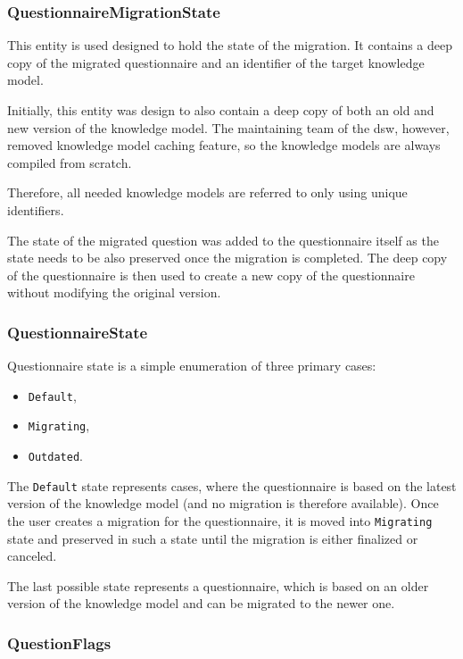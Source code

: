 \subsubsection*{QuestionnaireMigrationState}

This entity is used designed to hold the state of the migration.
It contains a deep copy of the migrated questionnaire and an identifier of the target knowledge model.

Initially, this entity was design to also contain a deep copy of both an old and new version of the knowledge model.
The maintaining team of the \gls{dsw}, however, removed knowledge model caching feature, so the knowledge models are always compiled from scratch\cite{gh-dsw-release-1.5}.

Therefore, all needed knowledge models are referred to only using unique identifiers.

The state of the migrated question was added to the questionnaire itself as the state needs to be also preserved once the migration is completed.
The deep copy of the questionnaire is then used to create a new copy of the questionnaire without modifying the original version.

\subsubsection*{QuestionnaireState}

Questionnaire state is a simple enumeration of three primary cases:

\begin{itemize}
    \item \texttt{Default},
    \item \texttt{Migrating},
    \item \texttt{Outdated}.
\end{itemize}

The \texttt{Default} state represents cases, where the questionnaire is based on the latest version of the knowledge model (and no migration is therefore available).
Once the user creates a migration for the questionnaire, it is moved into \texttt{Migrating} state and preserved in such a state until the migration is either finalized or canceled.

The last possible state represents a questionnaire, which is based on an older version of the knowledge model and can be migrated to the newer one.

\subsubsection*{QuestionFlags}

